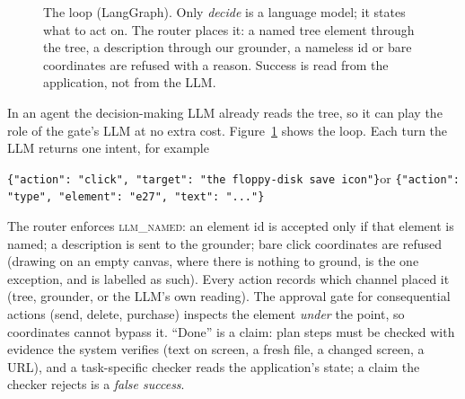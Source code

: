 \documentclass[11pt]{article}
\begin{document}
\begin{figure}[t]
\centering
{}
\caption{The loop (LangGraph). Only \emph{decide} is a language model; it states what to act on. The router
places it: a named tree element through the tree, a description through our grounder, a nameless id or bare
coordinates are refused with a reason. Success is read from the application, not from the LLM.}
\label{fig:loop}
\end{figure}

In an agent the decision-making LLM already reads the tree, so it can play the role of the gate's LLM at no
extra cost. Figure~\ref{fig:loop} shows the loop. Each turn the LLM returns one intent, for example
\begin{center}\small
\verb|{"action": "click", "target": "the floppy-disk save icon"}|\quad or\quad
\verb|{"action": "type", "element": "e27", "text": "..."}|
\end{center}
The router enforces \textsc{llm\_named}: an element id is accepted only if that element is named; a
description is sent to the grounder; bare click coordinates are refused (drawing on an empty canvas, where
there is nothing to ground, is the one exception, and is labelled as such). Every action records which
channel placed it (tree, grounder, or the LLM's own reading). The approval gate for consequential actions
(send, delete, purchase) inspects the element \emph{under} the point, so coordinates cannot bypass it.
``Done'' is a claim: plan steps must be checked with evidence the system verifies (text on screen, a fresh
file, a changed screen, a URL), and a task-specific checker reads the application's state; a claim the
checker rejects is a \emph{false success}.
\end{document}
